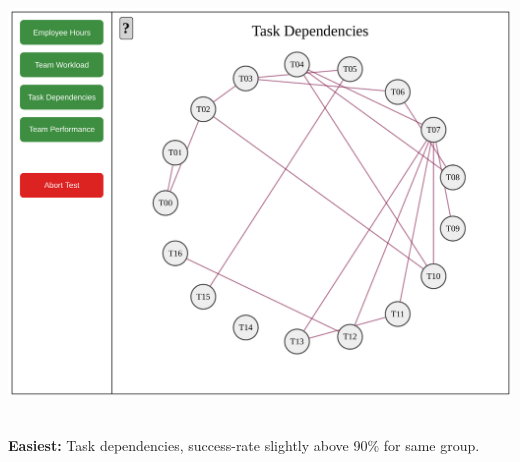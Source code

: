 \documentclass[xcolor=svgnames,10pt,aspectratio=1610]{beamer}
\begin{document}
\begin{frame}
\begin{minipage}{\textwidth}
\begin{minipage}{\textwidth}
\begin{minipage}{0.49\textwidth}
        \includegraphics[width=\textwidth]{../msccls/figures/captures/webapp_dependencies_task.pdf}
      \end{minipage}
    \end{minipage}
  \end{minipage}
  \vspace{0.1cm}\\ \textbf{Easiest:} Task dependencies, success-rate slightly above 90\% for same group.
\end{frame}
\end{document}
